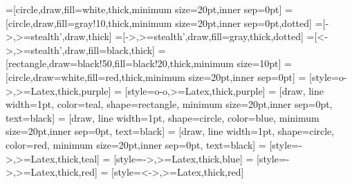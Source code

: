 \usepackage{fullpage}
\usepackage{enumerate}
\usepackage{amsmath}
\usepackage{amssymb}
\usepackage{enumerate}
\usepackage[svgnames]{xcolor}
\usepackage{fancyhdr}
\usepackage{enumitem}
\usepackage{dsfont}
\usepackage{graphicx}
\usepackage{float}
\usepackage{xr}

\usepackage{geometry}
\geometry{
  a4paper,
  left=28mm,
  right=28mm,
  top=28mm,
}
\usepackage{tikz}
\usepackage{bm}
\usepackage{verbatim}
\usepackage{fancyhdr}
\usetikzlibrary{automata, positioning}
\usepackage[explicit]{titlesec}
\usepackage[T1]{fontenc}
\usepackage[latin1]{inputenc}
\usepackage[english]{babel}
\usepackage{amsopn}
\usepackage{enumerate}
\usepackage{multirow}
\usepackage{caption}
\usepackage{amsmath, amssymb, amsfonts}
\usepackage{amsthm}
\usepackage{mathrsfs}
\usepackage{cancel}
\usepackage{bbm}
\usepackage{enumitem}
\usepackage{algpseudocode}
\usepackage{algorithm}

\usepackage{hyperref}
\hypersetup{
  colorlinks=true,
  linkcolor=blue,
  pdfpagemode=UseOutlines
}





\usetikzlibrary{arrows,arrows.meta,calc,fit}
\usetikzlibrary{positioning,patterns,matrix}
\usetikzlibrary{decorations.markings,decorations.pathreplacing,decorations.pathmorphing}
\usetikzlibrary{shapes,shapes.arrows,shapes.geometric,shapes.multipart}

=[circle,draw,fill=white,thick,minimum size=20pt,inner sep=0pt]
=[circle,draw,fill=gray!10,thick,minimum size=20pt,inner sep=0pt,dotted]
=[->,>=stealth',draw,thick]
=[->,>=stealth',draw,fill=gray,thick,dotted]
=[<->,>=stealth',draw,fill=black,thick]
=[rectangle,draw=black!50,fill=black!20,thick,minimum size=10pt] %
=[circle,draw=white,fill=red,thick,minimum size=20pt,inner sep=0pt]
 = [style={o->,>=Latex,thick,purple}]
 = [style={o-o,>=Latex,thick,purple}]
 = [draw, line width=1pt, color=teal, shape=rectangle, minimum size=20pt,inner sep=0pt, text=black]
 = [draw, line width=1pt, shape=circle, color=blue, minimum size=20pt,inner sep=0pt, text=black]
 = [draw, line width=1pt, shape=circle, color=red, minimum size=20pt,inner sep=0pt, text=black]
 = [style={->,>=Latex,thick,teal}]
 = [style={->,>=Latex,thick,blue}]
 = [style={->,>=Latex,thick,red}]
 = [style={<->,>=Latex,thick,red}]

